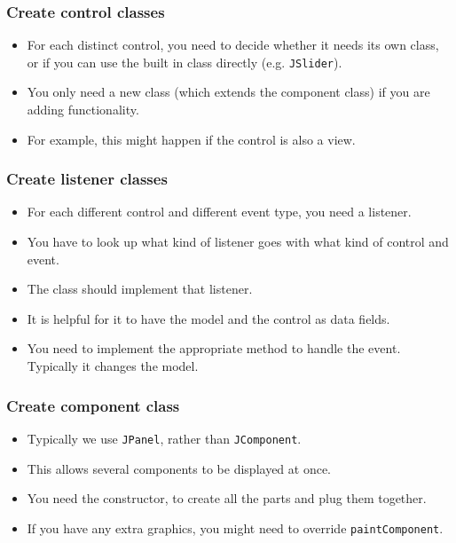 \documentclass{beamer}
\def\mcolor#1#2{\rule{0ex}{0ex}\color{#1}#2\color{black}{}}
\begin{document}
\begin{frame}
\frametitle{Create control classes}
\begin{itemize}
\item For each distinct control, you need to decide whether it needs
  its own class, or if you can use the built in class directly (e.g.
  \texttt{JSlider}).
\item \mcolor{blue}{You only need a new class (which extends the component class) if
  you are adding functionality.}
\item For example, this might happen if the control is also a view.
\end{itemize}
\end{frame}

\begin{frame}
\frametitle{Create listener classes}
\begin{itemize}
\item \mcolor{blue}{For each different control and different event
    type, you need a listener.}
\item You have to look up what kind of listener goes with what kind of
  control and event.
\item The class should implement that listener.
\item It is helpful for it to have the model and the control as data
  fields.
\item You need to implement the appropriate method to handle the
  event.  Typically it changes the model.
\end{itemize}
\end{frame}

\begin{frame}
  \frametitle{Create component class }
\begin{itemize}
\item \mcolor{blue}{Typically we use \texttt{JPanel}, rather than \texttt{JComponent}.}
\item This allows several components to be displayed at once.
\item You need the constructor, to create all the parts and plug them
  together.
\item If you have any extra graphics, you might need to override
  \texttt{paintComponent}.  
\end{itemize}
\end{frame}
\end{document}
